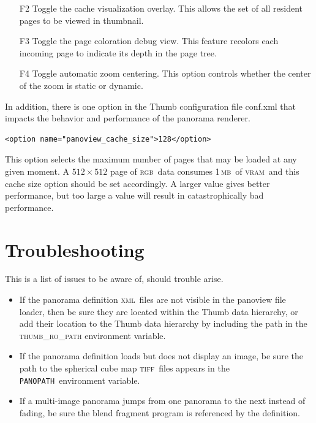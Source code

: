 \documentclass[oneside,10pt]{memoir}
\newcommand{\tiff}    {\textsc{tiff}}
\newcommand{\xml}     {\textsc{xml}}
\newcommand{\panopath}{\texttt{PANOPATH}}
\newcommand{\rgb}     {\textsc{rgb}}
\newcommand{\mb}    {\,\textsc{mb}}
\newcommand{\vram}    {\textsc{vram}}
\begin{document}
\begin{Spacing}{1.1}
\begin{itemize}
\item[F2] Toggle the cache visualization overlay. This allows the set of all resident pages to be viewed in thumbnail.

\item[F3] Toggle the page coloration debug view. This feature recolors each incoming page to indicate its depth in the page tree.

\item[F4] Toggle automatic zoom centering. This option controls whether the center of the zoom is static or dynamic.
\end{itemize}

In addition, there is one option in the Thumb configuration file conf.xml that impacts the behavior and performance of the panorama renderer.


\begin{Verbatim}
<option name="panoview_cache_size">128</option>
\end{Verbatim}

This option selects the maximum number of pages that may be loaded at any given moment. A $512\times 512$ page of \rgb\ data consumes 1\mb\ of \vram\, and this cache size option should be set accordingly. A larger value gives better performance, but too large a value will result in catastrophically bad performance.

\section{Troubleshooting}

This is a list of issues to be aware of, should trouble arise.

\begin{itemize}
\item If the panorama definition \xml\ files are not visible in the panoview file loader, then be sure they are located within the Thumb data hierarchy, or add their location to the Thumb data hierarchy by including the path in the \textsc{thumb\_ro\_path} environment variable.

\item If the panorama definition loads but does not display an image, be sure the path to the spherical cube map \tiff\ files appears in the \panopath\ environment variable.

\item If a multi-image panorama jumps from one panorama to the next instead of fading, be sure the blend fragment program is referenced by the definition.


\end{itemize}
\end{Spacing}
\end{document}
